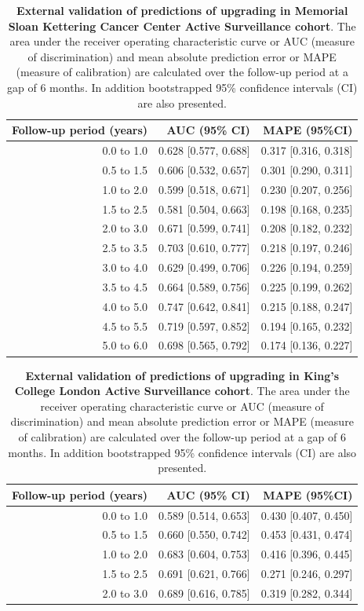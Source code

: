 \begin{table}[!htb]
\small\sf\centering
\caption{\textbf{External validation of predictions of upgrading in Memorial Sloan Kettering Cancer Center Active Surveillance cohort}. The area under the receiver operating characteristic curve or AUC (measure of discrimination) and mean absolute prediction error or MAPE (measure of calibration) are calculated over the follow-up period at a gap of 6 months. In addition bootstrapped 95\% confidence intervals (CI) are also presented.}
\label{tab:AUC_PE_MSKCC}
\begin{tabular}{r|r|r}
\hline
\hline
Follow-up period (years) & AUC (95\% CI) & MAPE (95\%CI)\\ 
\hline
0.0 to 1.0 & 0.628 [0.577, 0.688]  & 0.317 [0.316, 0.318]\\
0.5 to 1.5 & 0.606 [0.532, 0.657]  & 0.301 [0.290, 0.311]\\
1.0 to 2.0 & 0.599 [0.518, 0.671]  & 0.230 [0.207, 0.256]\\
1.5 to 2.5 & 0.581 [0.504, 0.663]  & 0.198 [0.168, 0.235]\\
2.0 to 3.0 & 0.671 [0.599, 0.741]  & 0.208 [0.182, 0.232]\\
2.5 to 3.5 & 0.703 [0.610, 0.777]  & 0.218 [0.197, 0.246]\\
3.0 to 4.0 & 0.629 [0.499, 0.706]  & 0.226 [0.194, 0.259]\\
3.5 to 4.5 & 0.664 [0.589, 0.756]  & 0.225 [0.199, 0.262]\\
4.0 to 5.0 & 0.747 [0.642, 0.841]  & 0.215 [0.188, 0.247]\\
4.5 to 5.5 & 0.719 [0.597, 0.852]  & 0.194 [0.165, 0.232]\\
5.0 to 6.0 & 0.698 [0.565, 0.792]  & 0.174 [0.136, 0.227]\\
\hline
\end{tabular}	
\end{table}

\begin{table}[!htb]
\small\sf\centering
\caption{\textbf{External validation of predictions of upgrading in King's College London Active Surveillance cohort}. The area under the receiver operating characteristic curve or AUC (measure of discrimination) and mean absolute prediction error or MAPE (measure of calibration) are calculated over the follow-up period at a gap of 6 months. In addition bootstrapped 95\% confidence intervals (CI) are also presented.}
\label{tab:AUC_PE_KCL}
\begin{tabular}{r|r|r}
\hline
\hline
Follow-up period (years) & AUC (95\% CI) & MAPE (95\%CI)\\ 
\hline
0.0 to 1.0 & 0.589 [0.514, 0.653] & 0.430 [0.407, 0.450] \\
0.5 to 1.5 & 0.660 [0.550, 0.742] & 0.453 [0.431, 0.474] \\
1.0 to 2.0 & 0.683 [0.604, 0.753] & 0.416 [0.396, 0.445] \\
1.5 to 2.5 & 0.691 [0.621, 0.766] & 0.271 [0.246, 0.297] \\
2.0 to 3.0 & 0.689 [0.616, 0.785] & 0.319 [0.282, 0.344] \\
\hline
\end{tabular}	
\end{table}

